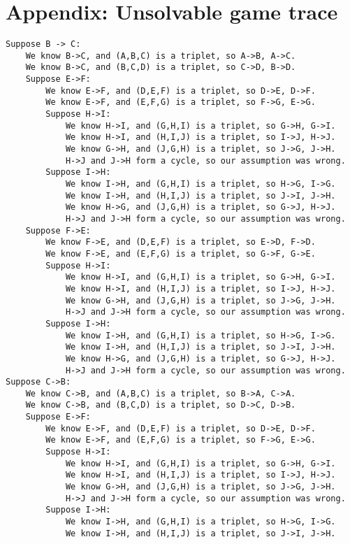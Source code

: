 \documentclass[12pt,x11names, rgb]{article}
\begin{document}
\section{Appendix: Unsolvable game trace}
\label{appendix:worst-case}
   \begin{verbatim}
Suppose B -> C:
    We know B->C, and (A,B,C) is a triplet, so A->B, A->C.
    We know B->C, and (B,C,D) is a triplet, so C->D, B->D.
    Suppose E->F:
        We know E->F, and (D,E,F) is a triplet, so D->E, D->F.
        We know E->F, and (E,F,G) is a triplet, so F->G, E->G.
        Suppose H->I:
            We know H->I, and (G,H,I) is a triplet, so G->H, G->I.
            We know H->I, and (H,I,J) is a triplet, so I->J, H->J.
            We know G->H, and (J,G,H) is a triplet, so J->G, J->H.
            H->J and J->H form a cycle, so our assumption was wrong.
        Suppose I->H:
            We know I->H, and (G,H,I) is a triplet, so H->G, I->G.
            We know I->H, and (H,I,J) is a triplet, so J->I, J->H.
            We know H->G, and (J,G,H) is a triplet, so G->J, H->J.
            H->J and J->H form a cycle, so our assumption was wrong.
    Suppose F->E:
        We know F->E, and (D,E,F) is a triplet, so E->D, F->D.
        We know F->E, and (E,F,G) is a triplet, so G->F, G->E.
        Suppose H->I:
            We know H->I, and (G,H,I) is a triplet, so G->H, G->I.
            We know H->I, and (H,I,J) is a triplet, so I->J, H->J.
            We know G->H, and (J,G,H) is a triplet, so J->G, J->H.
            H->J and J->H form a cycle, so our assumption was wrong.
        Suppose I->H:
            We know I->H, and (G,H,I) is a triplet, so H->G, I->G.
            We know I->H, and (H,I,J) is a triplet, so J->I, J->H.
            We know H->G, and (J,G,H) is a triplet, so G->J, H->J.
            H->J and J->H form a cycle, so our assumption was wrong.
Suppose C->B:
    We know C->B, and (A,B,C) is a triplet, so B->A, C->A.
    We know C->B, and (B,C,D) is a triplet, so D->C, D->B.
    Suppose E->F:
        We know E->F, and (D,E,F) is a triplet, so D->E, D->F.
        We know E->F, and (E,F,G) is a triplet, so F->G, E->G.
        Suppose H->I:
            We know H->I, and (G,H,I) is a triplet, so G->H, G->I.
            We know H->I, and (H,I,J) is a triplet, so I->J, H->J.
            We know G->H, and (J,G,H) is a triplet, so J->G, J->H.
            H->J and J->H form a cycle, so our assumption was wrong.
        Suppose I->H:
            We know I->H, and (G,H,I) is a triplet, so H->G, I->G.
            We know I->H, and (H,I,J) is a triplet, so J->I, J->H.

\end{verbatim}
\end{document}
